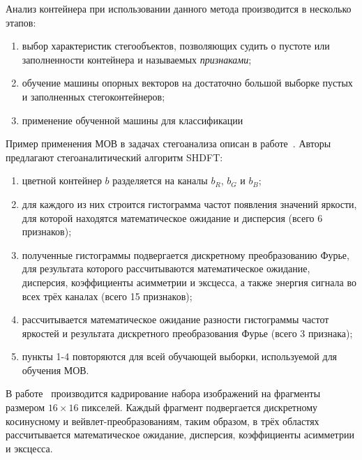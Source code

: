 Анализ контейнера при использовании данного метода производится в несколько этапов:
\begin{enumerate}
\item выбор характеристик стегообъектов, позволяющих судить о пустоте или заполненности контейнера и называемых \textit{признаками};
\item обучение машины опорных векторов на достаточно большой выборке пустых и заполненных стегоконтейнеров;
\item применение обученной машины для классификации 
\end{enumerate}

Пример применения МОВ в задачах стегоанализа описан в работе~\cite{HistogramDFTSVM}. Авторы предлагают стегоаналитический алгоритм SHDFT:
\begin{enumerate}
\item цветной контейнер $ b $ разделяется на каналы $ b_R $, $ b_G $ и $ b_B $;
\item для каждого из них строится гистограмма частот появления значений яркости, для которой находятся математическое ожидание и дисперсия (всего 6 признаков);
\item полученные гистограммы подвергается дискретному преобразованию Фурье, для результата которого рассчитываются математическое ожидание, дисперсия, коэффициенты асимметрии и эксцесса, а также энергия сигнала во всех трёх каналах (всего 15 признаков);
\item рассчитывается математическое ожидание разности гистограммы частот яркостей и результата дискретного преобразования Фурье (всего 3 признака);
\item пункты 1-4 повторяются для всей обучающей выборки, используемой для обучения МОВ.
\end{enumerate}

В работе~\cite{RishidasS2015} производится кадрирование набора изображений на фрагменты размером $ 16 \times 16 $ пикселей. Каждый фрагмент подвергается дискретному косинусному и вейвлет-преобразованиям, таким образом, в трёх областях рассчитывается математическое ожидание, дисперсия, коэффициенты асимметрии и эксцесса.

\clearpage
